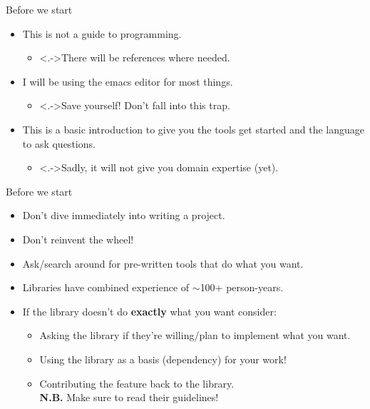 \documentclass[usenames,dvipsnames]{beamer}
\begin{document}
\begin{frame}{Before we start}
    \begin{itemize}[<+->]
        \item{}This is not a guide to programming. 
        \begin{itemize}
            \item<.->{}There will be references where needed.
        \end{itemize}
        \item{}I will be using the emacs editor for most things. 
        \begin{itemize}
            \item<.->{}Save yourself! Don't fall into this trap.
        \end{itemize}
        \item{}This is a basic introduction to give you the tools get started and the language to ask questions. 
        \begin{itemize}
            \item<.->{}Sadly, it will not give you domain expertise (yet).
        \end{itemize}
    \end{itemize}
\end{frame}

\begin{frame}{Before we start}
    \begin{itemize}[<+->]
        \item{}Don't dive immediately into writing a project.
        \item{}Don't reinvent the wheel!
        \item{}Ask/search around for pre-written tools that do what you want.
        \item{}Libraries have combined experience of $\sim{}\!$100+ person-years.
        \item{}If the library doesn't do \textbf{exactly} what you want consider:
        \begin{itemize}
            \item{}Asking the library if they're willing/plan to implement what you want.
            \item{}Using the library as a basis (dependency) for your work!
            \item{}Contributing the feature back to the library. \\ \textbf{N.B.} Make sure to read their guidelines!
        \end{itemize}
    \end{itemize}
\end{frame}
\end{document}

